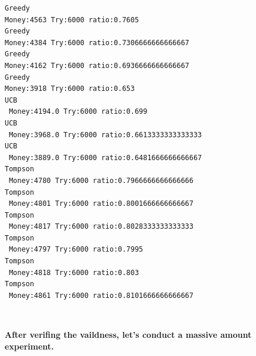 \documentclass[11pt]{article}
\begin{document}
    \begin{Verbatim}[commandchars=\\\{\}]
Greedy
Money:4563 Try:6000 ratio:0.7605
Greedy
Money:4384 Try:6000 ratio:0.7306666666666667
Greedy
Money:4162 Try:6000 ratio:0.6936666666666667
Greedy
Money:3918 Try:6000 ratio:0.653
UCB
 Money:4194.0 Try:6000 ratio:0.699
UCB
 Money:3968.0 Try:6000 ratio:0.6613333333333333
UCB
 Money:3889.0 Try:6000 ratio:0.6481666666666667
Tompson
 Money:4780 Try:6000 ratio:0.7966666666666666
Tompson
 Money:4801 Try:6000 ratio:0.8001666666666667
Tompson
 Money:4817 Try:6000 ratio:0.8028333333333333
Tompson
 Money:4797 Try:6000 ratio:0.7995
Tompson
 Money:4818 Try:6000 ratio:0.803
Tompson
 Money:4861 Try:6000 ratio:0.8101666666666667

    \end{Verbatim}

    \begin{center}
    \end{center}
    { \hspace*{\fill} \\}
    
    \textbf{After verifing the vaildness, let's conduct a massive amount
experiment.}
\end{document}

